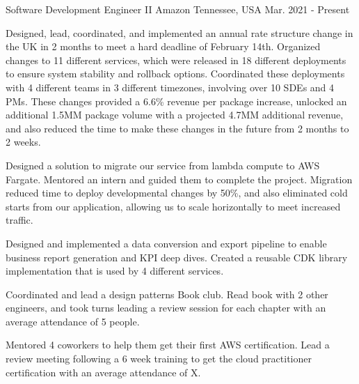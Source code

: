 

\begin{cventries}

  \cventry
    {Software Development Engineer II} %
    {Amazon} %
    {Tennessee, USA} %
    {Mar. 2021 - Present} %
    {
      \begin{cvitems} %
        \item {Designed, lead, coordinated, and implemented an annual rate structure change in the UK in 2 months to meet a hard deadline of February 14th. Organized changes to 11 different services, which were released in 18 different deployments to ensure system stability and rollback options. Coordinated these deployments with 4 different teams in 3 different timezones, involving over 10 SDEs and 4 PMs. These changes provided a 6.6\% revenue per package increase, unlocked an additional 1.5MM package volume with a projected 4.7MM additional revenue, and also reduced the time to make these changes in the future from 2 months to 2 weeks.}
        \item {Designed a solution to migrate our service from lambda compute to AWS Fargate. Mentored an intern and guided them to complete the project. Migration reduced time to deploy developmental changes by 50\%, and also eliminated cold starts from our application, allowing us to scale horizontally to meet increased traffic.}
        \item {Designed and implemented a data conversion and export pipeline to enable business report generation and KPI deep dives. Created a reusable CDK library implementation that is used by 4 different services.}
        \item {Coordinated and lead a design patterns Book club. Read book with 2 other engineers, and took turns leading a review session for each chapter with an average attendance of 5 people.}
        \item {Mentored 4 coworkers to help them get their first AWS certification. Lead a review meeting following a 6 week training to get the cloud practitioner certification with an average attendance of X.}
      \end{cvitems}
    }


\end{cventries}
